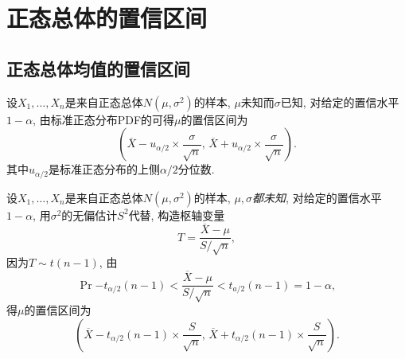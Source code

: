 \section{正态总体的置信区间}
\subsection{正态总体均值的置信区间}
设$X_1,\ldots,X_n$是来自正态总体$N(\mu,\sigma^2)$的样本, $\mu$未知而$\sigma$已知, 对给定的置信水平$1-\alpha$, 由标准正态分布PDF的可得$\mu$的置信区间为
\begin{equation}
    \left(\overline{X} - u_{\alpha/2}\times\dfrac{\sigma}{\sqrt{n}},\, \overline{X}+u_{\alpha/2}\times\dfrac{\sigma}{\sqrt{n}}\right).
    \label{eq:6.6}
\end{equation}
其中$u_{\alpha/2}$是标准正态分布的上侧$\alpha/2$分位数.

设$X_1,\ldots,X_n$是来自正态总体$N(\mu,\sigma^2)$的样本, $\mu,\sigma$\emph{都未知}, 对给定的置信水平$1-\alpha$, 用$\sigma^2$的无偏估计$S^2$代替, 构造枢轴变量
\begin{equation*}
    T = \dfrac{\overline{X}-\mu}{S/\sqrt{n}},
\end{equation*}
因为$T\sim t(n-1)$, 由
\[\Pr{-t_{\alpha/2}(n-1)<\dfrac{\overline{X} - \mu}{S/\sqrt{n}}<t_{a/2}(n-1)} = 1-\alpha,\]
得$\mu$的置信区间为
\begin{equation}
    \left(\overline{X}-t_{\alpha/2}(n-1)\times\dfrac{S}{\sqrt{n}},\,\overline{X}+t_{\alpha/2}(n-1)\times\dfrac{S}{\sqrt{n}}\right).
\end{equation}
